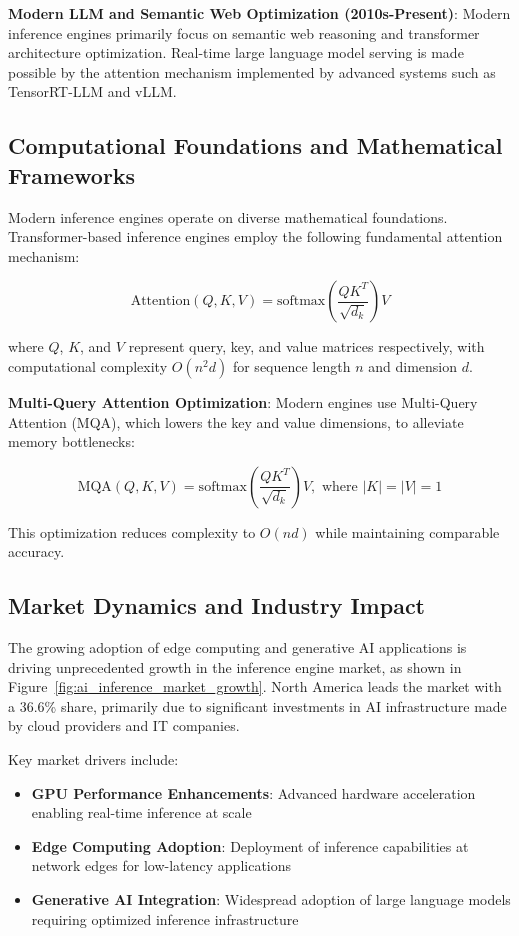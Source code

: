 \documentclass[12pt,a4paper]{article}
\begin{document}
\textbf{Modern LLM and Semantic Web Optimization (2010s-Present)}: Modern inference engines primarily focus on semantic web reasoning and transformer architecture optimization. Real-time large language model serving is made possible by the attention mechanism implemented by advanced systems such as TensorRT-LLM and vLLM.

\subsection{Computational Foundations and Mathematical Frameworks}
Modern inference engines operate on diverse mathematical foundations. Transformer-based inference engines employ the following fundamental attention mechanism:

\begin{equation}
\text{Attention}(Q,K,V) = \text{softmax}\left(\frac{QK^T}{\sqrt{d_k}}\right)V
\end{equation}

where $Q$, $K$, and $V$ represent query, key, and value matrices respectively, with computational complexity $O(n^2d)$ for sequence length $n$ and dimension $d$.

\textbf{Multi-Query Attention Optimization}: Modern engines use Multi-Query Attention (MQA), which lowers the key and value dimensions, to alleviate memory bottlenecks:

\begin{equation}
\text{MQA}(Q,K,V) = \text{softmax}\left(\frac{QK^T}{\sqrt{d_k}}\right)V, \text{ where } |K|=|V|=1
\end{equation}

This optimization reduces complexity to $O(nd)$ while maintaining comparable accuracy.

\subsection{Market Dynamics and Industry Impact}
The growing adoption of edge computing and generative AI applications is driving unprecedented growth in the inference engine market, as shown in Figure~\ref{fig:ai_inference_market_growth}. North America leads the market with a 36.6\% share, primarily due to significant investments in AI infrastructure made by cloud providers and IT companies.

Key market drivers include:
\begin{itemize}
    \item \textbf{GPU Performance Enhancements}: Advanced hardware acceleration enabling real-time inference at scale
    \item \textbf{Edge Computing Adoption}: Deployment of inference capabilities at network edges for low-latency applications
    \item \textbf{Generative AI Integration}: Widespread adoption of large language models requiring optimized inference infrastructure
\end{itemize}
\end{document}
